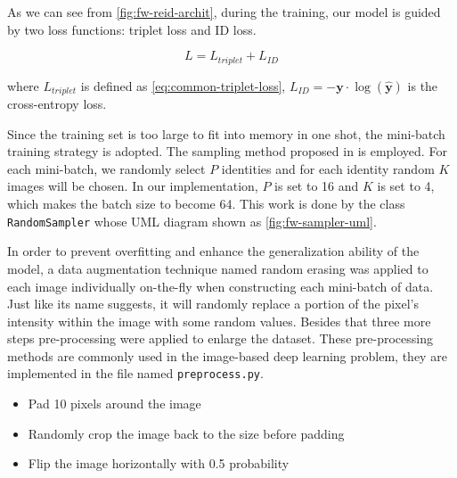 As we can see from \autoref{fig:fw-reid-archit}, during the training, our model
is guided by two loss functions: triplet loss
and ID loss.


\begin{equation}
L = L_{triplet} + L_{ID}
\end{equation}

\noindent where $L_{triplet}$ is defined as \autoref{eq:common-triplet-loss},
$L_{ID} = - \mathbf{y} \cdot \log(\mathbf{\hat{y}})$
is the cross-entropy loss.

Since the training set is too large to fit into memory in one shot, the mini-batch
training strategy is adopted. The sampling method proposed in
\cite{in-defense-of-triplet-loss-for-reid-2017} is employed. For each
mini-batch, we randomly select $P$ identities and for each identity random $K$
images will be chosen. In our implementation,
$P$ is set to 16 and $K$ is set to 4, which makes the batch size to become 64.
This work is done by the class \texttt{RandomSampler} whose UML diagram shown as
\autoref{fig:fw-sampler-uml}.

In order to prevent overfitting and enhance the generalization ability of the
model, a data augmentation technique named random erasing
\cite{random-erasing-data-augmentation-2017} was applied to each image
individually on-the-fly when constructing each mini-batch of data. Just like its
name suggests, it will randomly replace a portion of the pixel's intensity within
the image with some random values. Besides that three more steps pre-processing
were applied to enlarge the dataset. These pre-processing methods are commonly
used in the image-based deep learning problem, they are implemented in the file
named \texttt{preprocess.py}.

\begin{itemize}
    \item Pad 10 pixels around the image
    \item Randomly crop the image back to the size before padding
    \item Flip the image horizontally with 0.5 probability
\end{itemize}

